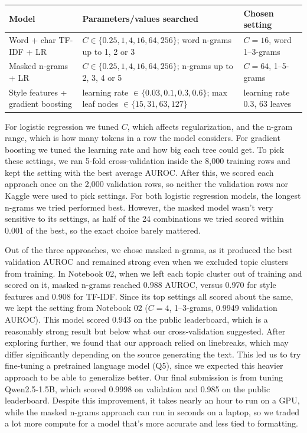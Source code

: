 \begin{tabularx}{\linewidth}{@{}p{1.35in}Yp{1.45in}@{}}\toprule Model & Parameters/values searched & Chosen setting \\ \midrule
Word + char TF-IDF + LR & $C \in \{0.25, 1, 4, 16, 64, 256\}$; word n-grams up to 1, 2 or 3 & $C=16$, word 1--3-grams \\
Masked n-grams + LR & $C \in \{0.25, 1, 4, 16, 64, 256\}$; n-grams up to 2, 3, 4 or 5 & $C=64$, 1--5-grams \\
Style features + gradient boosting & learning rate $\in \{0.03, 0.1, 0.3, 0.6\}$; max leaf nodes $\in \{15, 31, 63, 127\}$ & learning rate 0.3, 63 leaves \\
\bottomrule\end{tabularx}
\par\noindent
For logistic regression we tuned $C$, which affects regularization, and the n-gram range, which is how many tokens in a row the model considers.
For gradient boosting we tuned the learning rate and how big each tree could get. 
To pick these settings, we ran 5-fold cross-validation inside the 8{,}000 training rows and kept the setting with the best average AUROC.
After this, we scored each approach once on the 2{,}000 validation rows, so neither the validation rows nor Kaggle were used to pick settings.
For both logistic regression models, the longest n-grams we tried performed best.
However, the masked model wasn't very sensitive to its settings, as half of the 24 combinations we tried scored within 0.001 of the best, so the exact choice barely mattered.

Out of the three approaches, we chose masked n-grams, as it produced the best validation AUROC and remained strong even when we excluded topic clusters from training.
In Notebook 02, when we left each topic cluster out of training and scored on it, masked n-grams reached 0.988 AUROC, versus 0.970 for style features and 0.908 for TF-IDF.
Since its top settings all scored about the same, we kept the setting from Notebook 02 ($C=4$, 1--3-grams, 0.9949 validation AUROC). 
This model scored 0.943 on the public leaderboard, which is a reasonably strong result but below what our cross-validation suggested.
After exploring further, we found that our approach relied on linebreaks, which may differ significantly depending on the source generating the text.
This led us to try fine-tuning a pretrained language model (Q5), since we expected this heavier approach to be able to generalize better.
Our final submission is from tuning Qwen2.5-1.5B, which scored 0.9998 on validation and 0.985 on the public leaderboard.
Despite this improvement, it takes nearly an hour to run on a GPU, while the masked n-grams approach can run in seconds on a laptop, so we traded a lot more compute for a model that's more accurate and less tied to formatting.
